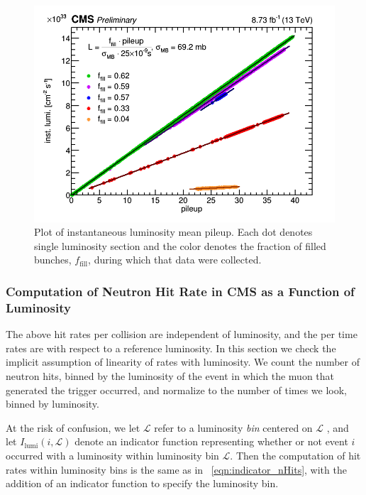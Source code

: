 \begin{figure}
	\centering
	\includegraphics[width=\dummyFigWidth]{figures/neutron/lumi_vs_pu_allfills.png}
	\caption{Plot of instantaneous luminosity \vs mean pileup. Each dot denotes single luminosity section and the color denotes the fraction of filled bunches, $f_\text{fill}$, during which that data were collected.}
	\label{fig:lumi_vs_pu}
\end{figure}

\subsubsection{Computation of Neutron Hit Rate in CMS as a Function of Luminosity}
\label{sec:hit_rate_vs_lumi}

The above hit rates per \pp collision are independent of luminosity, and the per time rates are with respect to a reference luminosity. In this section we check the implicit assumption of linearity of rates with luminosity. We count the number of neutron hits, binned by the luminosity of the event in which the muon that generated the trigger occurred, and normalize to the number of times we look, binned by luminosity. 

At the risk of confusion, we let $\mathcal{L}$ refer to a luminosity {\em bin} centered on $\mathcal{L}$ , and let $I_\text{lumi}(i, \mathcal{L})$ denote an indicator function representing whether or not event $i$ occurred with a luminosity within luminosity bin $\mathcal{L}$. Then the computation of hit rates within
luminosity bins is the same as in \Eq~\ref{eqn:indicator_nHits}, 
with the addition of an indicator function to specify the luminosity bin.

